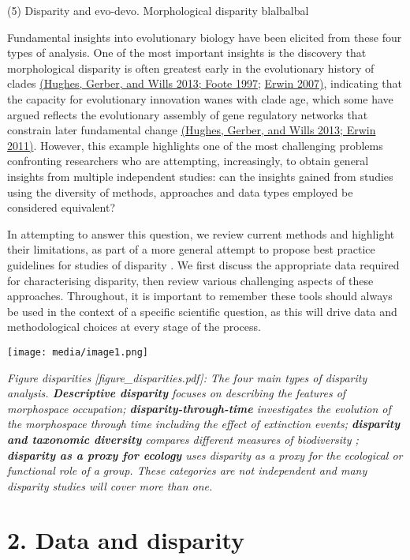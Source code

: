 (5) Disparity and evo-devo. Morphological disparity blalbalbal

Fundamental insights into evolutionary biology have been elicited from
these four types of analysis. One of the most important insights is the
discovery that morphological disparity is often greatest early in the
evolutionary history of clades
\href{https://paperpile.com/c/sTGYvp/xxh5+yqPw}{(Hughes, Gerber, and
Wills 2013; Foote 1997;}
\href{https://paperpile.com/c/sTGYvp/EPJ2}{Erwin 2007)}, indicating that
the capacity for evolutionary innovation wanes with clade age, which
some have argued reflects the evolutionary assembly of gene regulatory
networks that constrain later fundamental change
\href{https://paperpile.com/c/sTGYvp/xxh5+Z6l6}{(Hughes, Gerber, and
Wills 2013; Erwin 2011)}. However, this example highlights one of the
most challenging problems confronting researchers who are attempting,
increasingly, to obtain general insights from multiple independent
studies: can the insights gained from studies using the diversity of
methods, approaches and data types employed be considered equivalent?

In attempting to answer this question, we review current methods and
highlight their limitations, as part of a more general attempt to
propose best practice guidelines for studies of disparity . We first
discuss the appropriate data required for characterising disparity, then
review various challenging aspects of these approaches. Throughout, it
is important to remember these tools should always be used in the
context of a specific scientific question, as this will drive data and
methodological choices at every stage of the process.

\texttt{[image: media/image1.png]}

\emph{Figure disparities {[}figure\_disparities.pdf{]}: The four main
types of disparity analysis. \textbf{Descriptive disparity} focuses on
describing the features of morphospace occupation;
\textbf{disparity-through-time} investigates the evolution of the
morphospace through time including the effect of extinction events;
\textbf{disparity and taxonomic diversity} compares different measures
of biodiversity ; \textbf{disparity as a proxy for ecology} uses
disparity as a proxy for the ecological or functional role of a group.
These categories are not independent and many disparity studies will
cover more than one.}

\hypertarget{data-and-disparity}{%
\section{2. Data and disparity }\label{data-and-disparity}}

